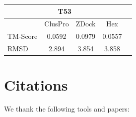 \documentclass{article}
\begin{document}
\begin{center}
\begin{tabular}{|l|c|c|c|r|}
\multicolumn{4}{c}{T53} \\
    \hline
      & ClusPro & ZDock & Hex \\ \hline
    TM-Score & 0.0592 & 0.0979 & 0.0557 \\ \hline
    RMSD & 2.894 & 3.854 & 3.858 \\
    \hline
    \end{tabular}
\end{center}





\section{Citations}

We thank the following tools and papers: \\\\
\end{document}
